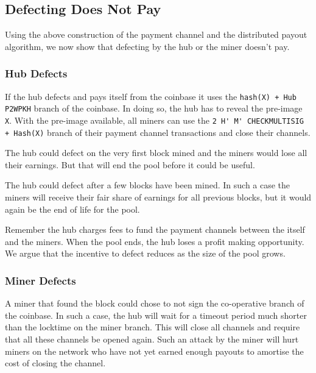 \documentclass{article}
\begin{document}



\subsection{Defecting Does Not Pay}\label{ref:defecting}

Using the above construction of the payment channel and the
distributed payout algorithm, we now show that defecting by the hub or
the miner doesn't pay.

\subsubsection{Hub Defects}\label{ref:hub-defects}

If the hub defects and pays itself from the coinbase it uses the
\verb|hash(X) + Hub P2WPKH| branch of the coinbase. In doing so, the
hub has to reveal the pre-image \verb|X|. With the pre-image
available, all miners can use the
\verb|2 H' M' CHECKMULTISIG + Hash(X)| branch of their payment channel
transactions and close their channels.

The hub could defect on the very first block mined and the miners
would lose all their earnings. But that will end the pool before it
could be useful.

The hub could defect after a few blocks have been mined. In such a
case the miners will receive their fair share of earnings for all
previous blocks, but it would again be the end of life for the pool.

Remember the hub charges fees to fund the payment channels between the
itself and the miners. When the pool ends, the hub loses a profit
making opportunity. We argue that the incentive to defect reduces as
the size of the pool grows.

\subsubsection{Miner Defects}\label{ref:miner-defects}

A miner that found the block could chose to not sign the co-operative
branch of the coinbase. In such a case, the hub will wait for a
timeout period much shorter than the locktime on the miner
branch. This will close all channels and require that all these
channels be opened again. Such an attack by the miner will hurt miners
on the network who have not yet earned enough payouts to amortise the
cost of closing the channel.
\end{document}
